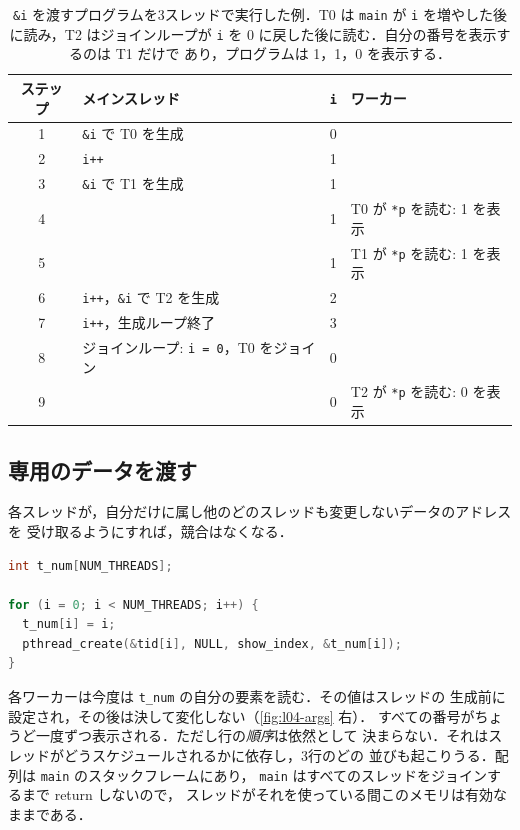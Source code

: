 \documentclass[../main.tex]{subfiles}
\begin{document}
\begin{table}[htbp]
  \centering
  \caption{\texttt{\&i} を渡すプログラムを3スレッドで実行した例．T0 は
    \texttt{main} が \texttt{i} を増やした後に読み，T2 はジョインループが
    \texttt{i} を 0 に戻した後に読む．自分の番号を表示するのは T1 だけで
    あり，プログラムは 1，1，0 を表示する．}
  \label{tab:l04-arg-race}
  \small
  \setlength{\tabcolsep}{4pt}
  \begin{tabular}{@{}clcl@{}}
    \toprule
    ステップ & メインスレッド & \texttt{i} & ワーカー \\
    \midrule
    1 & \texttt{\&i} で T0 を生成              & 0 & \\
    2 & \texttt{i++}                           & 1 & \\
    3 & \texttt{\&i} で T1 を生成              & 1 & \\
    4 &                                        & 1 & T0 が \texttt{*p} を読む: 1 を表示 \\
    5 &                                        & 1 & T1 が \texttt{*p} を読む: 1 を表示 \\
    6 & \texttt{i++}，\texttt{\&i} で T2 を生成 & 2 & \\
    7 & \texttt{i++}，生成ループ終了            & 3 & \\
    8 & ジョインループ: \texttt{i = 0}，T0 をジョイン & 0 & \\
    9 &                                        & 0 & T2 が \texttt{*p} を読む: 0 を表示 \\
    \bottomrule
  \end{tabular}
\end{table}

\subsection{専用のデータを渡す}

各スレッドが，自分だけに属し他のどのスレッドも変更しないデータのアドレスを
受け取るようにすれば，競合はなくなる．
\begin{lstlisting}[language=C, numbers=none]
int t_num[NUM_THREADS];

for (i = 0; i < NUM_THREADS; i++) {
  t_num[i] = i;
  pthread_create(&tid[i], NULL, show_index, &t_num[i]);
}
\end{lstlisting}
各ワーカーは今度は \texttt{t\_num} の自分の要素を読む．その値はスレッドの
生成前に設定され，その後は決して変化しない（\cref{fig:l04-args} 右）．
すべての番号がちょうど一度ずつ表示される．ただし行の\emph{順序}は依然として
決まらない．それはスレッドがどうスケジュールされるかに依存し，3行のどの
並びも起こりうる．配列は \texttt{main} のスタックフレームにあり，
\texttt{main} はすべてのスレッドをジョインするまで return しないので，
スレッドがそれを使っている間このメモリは有効なままである．
\end{document}
